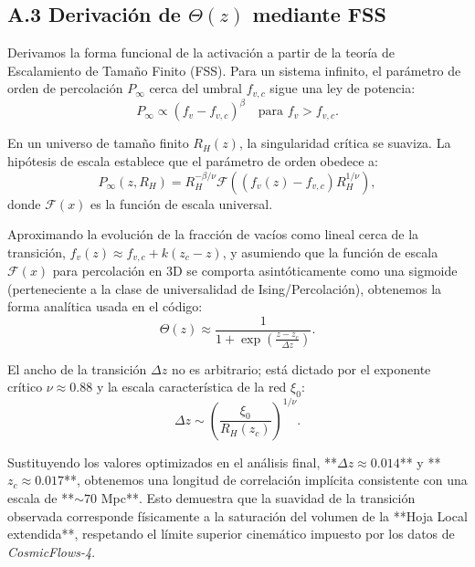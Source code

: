 \documentclass[12pt, a4paper]{article}
\theoremstyle{plain}
\theoremstyle{definition}
\begin{document}
\subsection{A.3 Derivación de $\Theta(z)$ mediante FSS}
\label{app:fss_derivation}

Derivamos la forma funcional de la activación a partir de la teoría de Escalamiento de Tamaño Finito (FSS).
Para un sistema infinito, el parámetro de orden de percolación $P_\infty$ cerca del umbral $f_{v,c}$ sigue una ley de potencia:
\begin{equation}
P_\infty \propto (f_v - f_{v,c})^\beta \quad \text{para } f_v > f_{v,c}.
\end{equation}

En un universo de tamaño finito $R_H(z)$, la singularidad crítica se suaviza. La hipótesis de escala establece que el parámetro de orden obedece a:
\begin{equation}
P_\infty(z, R_H) = R_H^{-\beta/\nu} \mathcal{F}\left( (f_v(z) - f_{v,c}) R_H^{1/\nu} \right),
\end{equation}
donde $\mathcal{F}(x)$ es la función de escala universal.

Aproximando la evolución de la fracción de vacíos como lineal cerca de la transición, $f_v(z) \approx f_{v,c} + k(z_c - z)$, y asumiendo que la función de escala $\mathcal{F}(x)$ para percolación en 3D se comporta asintóticamente como una sigmoide (perteneciente a la clase de universalidad de Ising/Percolación), obtenemos la forma analítica usada en el código:
\begin{equation}
\Theta(z) \approx \frac{1}{1 + \exp\left(\frac{z - z_c}{\Delta z}\right)}.
\end{equation}

El ancho de la transición $\Delta z$ no es arbitrario; está dictado por el exponente crítico $\nu \approx 0.88$ y la escala característica de la red $\xi_0$:
\begin{equation}
\Delta z \sim \left(\frac{\xi_0}{R_H(z_c)}\right)^{1/\nu}.
\end{equation}

Sustituyendo los valores optimizados en el análisis final, **$\Delta z \approx 0.014$** y **$z_c \approx 0.017$**, obtenemos una longitud de correlación implícita consistente con una escala de **$\sim 70$ Mpc**. Esto demuestra que la suavidad de la transición observada corresponde físicamente a la saturación del volumen de la **Hoja Local extendida**, respetando el límite superior cinemático impuesto por los datos de \textit{CosmicFlows-4}.
\end{document}
